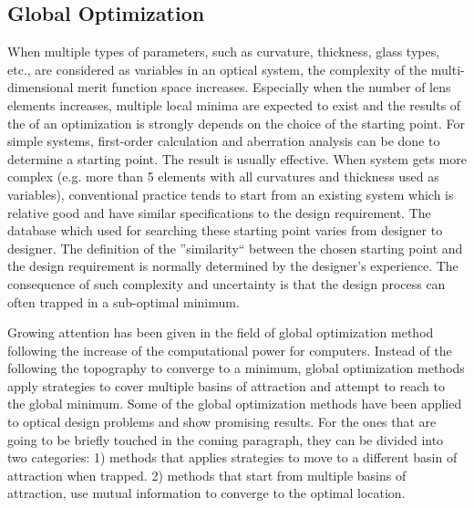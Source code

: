 \subsection{Global Optimization}
\vspace{1em}
When multiple types of parameters, such as curvature, thickness, glass types, etc., are considered as variables in an optical system, the complexity of the multi-dimensional merit function space increases. Especially when the number of lens elements increases, multiple local minima are expected to exist and the results of the of an optimization is strongly depends on the choice of the starting point. For simple systems, first-order calculation and aberration analysis can be done to determine a starting point. The result is usually effective. When system gets more complex (e.g. more than 5 elements with all curvatures and thickness used as variables), conventional practice tends to start from an existing system which is relative good and have similar specifications to the design requirement. The database which used for searching these starting point varies from designer to designer. The definition of the ”similarity“ between the chosen starting point and the design requirement is normally determined by the designer's experience. The consequence of such complexity and uncertainty is that the design process can often trapped in a sub-optimal minimum. 

Growing attention has been given in the field of global optimization method following the increase of the computational power for computers. Instead of the following the topography to converge to a minimum, global optimization methods apply strategies to cover multiple basins of attraction and attempt to reach to the global minimum. Some of the global optimization methods have been applied to optical design problems and show promising results. For the ones that are going to be briefly touched in the coming paragraph, they can be divided into two categories: 1) methods that applies strategies to move to a different basin of attraction when trapped. 2) methods that start from multiple basins of attraction, use mutual information to converge to the optimal location. 

